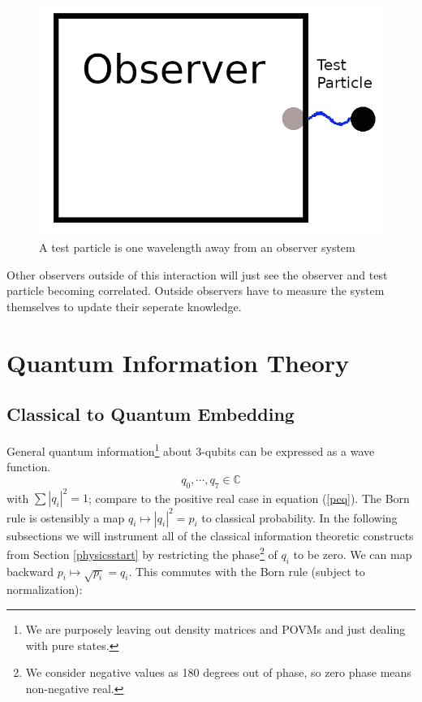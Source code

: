 \documentclass[12pt,a4paper]{article}
\theoremstyle{myrule}
\theoremstyle{postulate}
\theoremstyle{definition}
\begin{document}
\begin{figure}[h]
\centering
\includegraphics[scale=1.3]{context_change.png}
\caption{A test particle is one wavelength away from an observer system }
\label{context}
\end{figure}

Other observers outside of this interaction will just see the observer and test particle becoming correlated.  Outside observers have to measure the system themselves to update their seperate knowledge.

\section{Quantum Information Theory}
\subsection{Classical to Quantum Embedding}
\label{embed}
General quantum information\footnote{We are purposely leaving out density matrices and POVMs and just dealing with pure states.} about 3-qubits can be expressed as a wave function.
\[
   q_\mathit{0},\cdots,q_\mathit{7} \in \mathbb{C}
\]
with $\sum |q_i|^2 = 1$; compare to the positive real case in equation (\ref{peq}).  The Born rule is ostensibly a map $q_i \mapsto |q_i|^2 = p_i$ to classical probability.  In the following subsections we will instrument all of the classical information theoretic constructs from Section \ref{physicsstart} by restricting the phase\footnote{We consider negative values as 180 degrees out of phase, so zero phase means non-negative real.} of $q_i$ to be zero.  We can map backward $p_i \mapsto \sqrt{p_i} = q_i$.  This commutes with the Born rule (subject to normalization):
\end{document}
